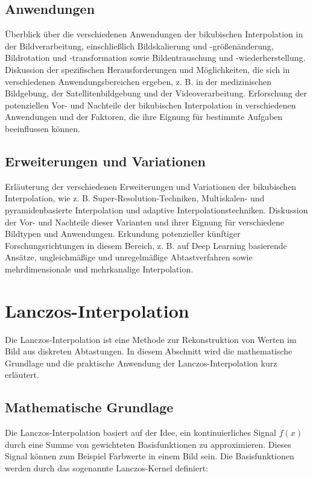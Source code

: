     \subsection{Anwendungen}

    Überblick über die verschiedenen Anwendungen der bikubischen Interpolation in der Bildverarbeitung, einschließlich Bildskalierung und -größenänderung, Bildrotation und -transformation sowie Bildentrauschung und -wiederherstellung.
    Diskussion der spezifischen Herausforderungen und Möglichkeiten, die sich in verschiedenen Anwendungsbereichen ergeben, z. B. in der medizinischen Bildgebung, der Satellitenbildgebung und der Videoverarbeitung.
    Erforschung der potenziellen Vor- und Nachteile der bikubischen Interpolation in verschiedenen Anwendungen und der Faktoren, die ihre Eignung für bestimmte Aufgaben beeinflussen können.

    \subsection{Erweiterungen und Variationen}

    Erläuterung der verschiedenen Erweiterungen und Variationen der bikubischen Interpolation, wie z. B. Super-Resolution-Techniken, Multiskalen- und pyramidenbasierte Interpolation und adaptive Interpolationstechniken.
    Diskussion der Vor- und Nachteile dieser Varianten und ihrer Eignung für verschiedene Bildtypen und Anwendungen.
    Erkundung potenzieller künftiger Forschungsrichtungen in diesem Bereich, z. B. auf Deep Learning basierende Ansätze, ungleichmäßige und unregelmäßige Abtastverfahren sowie mehrdimensionale und mehrkanalige Interpolation.


\section{Lanczos-Interpolation}
Die Lanczos-Interpolation ist eine Methode zur Rekonstruktion von Werten im Bild aus diskreten Abtastungen. In diesem Abschnitt wird die mathematische Grundlage und die praktische Anwendung der Lanczos-Interpolation kurz erläutert.

\subsection{Mathematische Grundlage}

Die Lanczos-Interpolation basiert auf der Idee, ein kontinuierliches Signal $f(x)$ durch eine Summe von gewichteten Basisfunktionen zu approximieren. 
Dieses Signal können zum Beispiel Farbwerte in einem Bild sein.
Die Basisfunktionen werden durch das sogenannte Lanczos-Kernel definiert:

